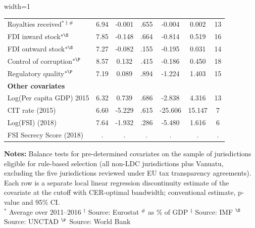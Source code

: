 \begin{table}[htbp]
\begin{adjustbox}{width=1\textwidth}
\begin{tabular}{l*{6}{c}}
Royalties received\(^{*\ddagger\#}\)&     6.94&   -0.001&     .655&   -0.004&    0.002&       13\\
FDI inward stock\(^{*\S}\)&     7.85&   -0.148&     .664&   -0.814&    0.519&       16\\
FDI outward stock\(^{*\S}\)&     7.27&   -0.082&     .155&   -0.195&    0.031&       14\\
Control of corruption\(^{*\P}\)&     8.57&    0.132&     .415&   -0.186&    0.450&       18\\
Regulatory quality\(^{*\P}\)&     7.19&    0.089&     .894&   -1.224&    1.403&       15\\
\midrule
{\bf Other covariates}&         &         &         &         &         &         \\
Log(Per capita GDP) 2015&     6.32&    0.739&     .686&   -2.838&    4.316&       13\\
CIT rate (2015)&     6.60&   -5.229&     .615&  -25.606&   15.147&        7\\
Log(FSI) (2018)&     7.64&   -1.932&     .286&   -5.480&    1.616&        6\\
FSI Secrecy Score (2018)&        .&        .&        .&        .&        .&        .\\
\bottomrule \end{tabular} \end{adjustbox} \begin{minipage}{0.95\textwidth} \footnotesize {\bf Notes:} Balance tests for pre-determined covariates on the sample of jurisdictions eligible for rule-based selection (all non-LDC jurisdictions plus Vanuatu, excluding the five jurisdictions reviewed under EU tax transparency agreements). Each row is a separate local linear regression discontinuity estimate of the covariate at the cutoff  with CER-optimal bandwidth; conventional estimate, p-value and 95\% CI. \\ \(^{*}\) Average over 2011--2016 \quad \(^{\dag}\) Source: Eurostat \quad \(^{\#}\) as \% of GDP \quad \(^{\ddagger}\) Source: IMF \quad \(^{\S}\) Source: UNCTAD \quad \(^{\P}\) Source: World Bank \end{minipage} \end{table}
